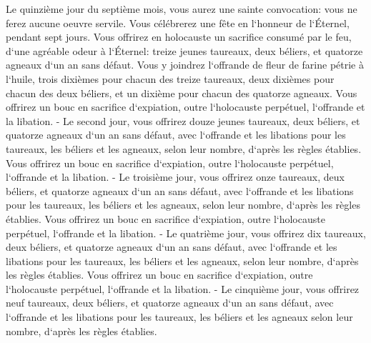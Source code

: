 \verse Le quinzième jour du septième mois, vous aurez une sainte convocation: vous ne ferez aucune oeuvre servile. Vous célébrerez une fête en l`honneur de l`Éternel, pendant sept jours. 
\verse Vous offrirez en holocauste un sacrifice consumé par le feu, d`une agréable odeur à l`Éternel: treize jeunes taureaux, deux béliers, et quatorze agneaux d`un an sans défaut. 
\verse Vous y joindrez l`offrande de fleur de farine pétrie à l`huile, trois dixièmes pour chacun des treize taureaux, deux dixièmes pour chacun des deux béliers, 
\verse et un dixième pour chacun des quatorze agneaux. 
\verse Vous offrirez un bouc en sacrifice d`expiation, outre l`holocauste perpétuel, l`offrande et la libation. - 
\verse Le second jour, vous offrirez douze jeunes taureaux, deux béliers, et quatorze agneaux d`un an sans défaut, 
\verse avec l`offrande et les libations pour les taureaux, les béliers et les agneaux, selon leur nombre, d`après les règles établies. 
\verse Vous offrirez un bouc en sacrifice d`expiation, outre l`holocauste perpétuel, l`offrande et la libation. - 
\verse Le troisième jour, vous offrirez onze taureaux, deux béliers, et quatorze agneaux d`un an sans défaut, 
\verse avec l`offrande et les libations pour les taureaux, les béliers et les agneaux, selon leur nombre, d`après les règles établies. 
\verse Vous offrirez un bouc en sacrifice d`expiation, outre l`holocauste perpétuel, l`offrande et la libation. - 
\verse Le quatrième jour, vous offrirez dix taureaux, deux béliers, et quatorze agneaux d`un an sans défaut, 
\verse avec l`offrande et les libations pour les taureaux, les béliers et les agneaux, selon leur nombre, d`après les règles établies. 
\verse Vous offrirez un bouc en sacrifice d`expiation, outre l`holocauste perpétuel, l`offrande et la libation. - 
\verse Le cinquième jour, vous offrirez neuf taureaux, deux béliers, et quatorze agneaux d`un an sans défaut, 
\verse avec l`offrande et les libations pour les taureaux, les béliers et les agneaux selon leur nombre, d`après les règles établies. 

